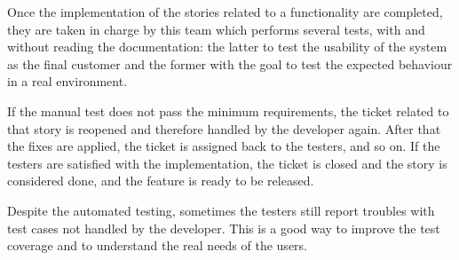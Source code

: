 Once the implementation of the stories related to a functionality are completed, they are taken in charge by this team which performs several tests, with and without reading the documentation: the latter to test the usability of the system as the final customer and the former with the goal to test the expected behaviour in a real environment.

If the manual test does not pass the minimum requirements, the ticket related to that story is reopened and therefore handled by the developer again. After that the fixes are applied, the ticket is assigned back to the testers, and so on. If the testers are satisfied with the implementation, the ticket is closed and the story is considered done, and the feature is ready to be released.

Despite the automated testing, sometimes the testers still report troubles with test cases not handled by the developer. This is a good way to improve the test coverage and to understand the real needs of the users.

